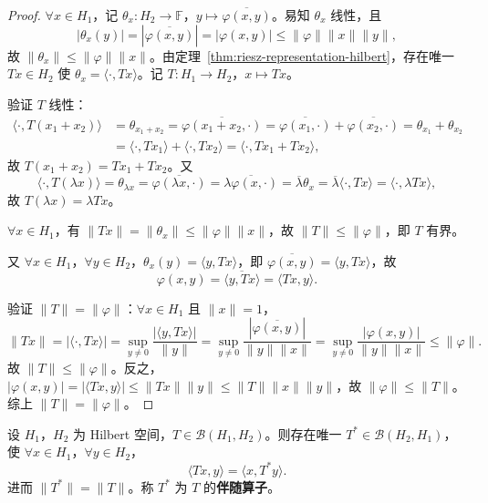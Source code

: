 \documentclass[lang=cn,a4paper,newtx,section]{elegantbook}
\begin{document}
\begin{proof}
  $\forall x\in H_1$，记 $\theta_x:H_2\to\mathbb{F}$，$y\mapsto\overline{\varphi(x,y)}$。易知 $\theta_x$ 线性，且
  \[
    |\theta_x(y)|=|\overline{\varphi(x,y)}|=|\varphi(x,y)|\leq\|\varphi\|\|x\|\|y\|,
  \]
  故 $\|\theta_x\|\leq\|\varphi\|\|x\|$。由定理~\ref{thm:riesz-representation-hilbert}，存在唯一 $Tx\in H_2$ 使 $\theta_x=\langle\cdot,Tx\rangle$。记 $T:H_1\to H_2$，$x\mapsto Tx$。

  验证 $T$ 线性：
  \begin{align*}
    \langle\cdot,T(x_1+x_2)\rangle&=\theta_{x_1+x_2}=\overline{\varphi(x_1+x_2,\cdot)}=\overline{\varphi(x_1,\cdot)}+\overline{\varphi(x_2,\cdot)}=\theta_{x_1}+\theta_{x_2}\\
    &=\langle\cdot,Tx_1\rangle+\langle\cdot,Tx_2\rangle=\langle\cdot,Tx_1+Tx_2\rangle,
  \end{align*}
  故 $T(x_1+x_2)=Tx_1+Tx_2$。又
  \[
    \langle\cdot,T(\lambda x)\rangle=\theta_{\lambda x}=\overline{\varphi(\lambda x,\cdot)}=\overline{\lambda\varphi(x,\cdot)}=\overline{\lambda}\theta_x=\overline{\lambda}\langle\cdot,Tx\rangle=\langle\cdot,\lambda Tx\rangle,
  \]
  故 $T(\lambda x)=\lambda Tx$。

  $\forall x\in H_1$，有 $\|Tx\|=\|\theta_x\|\leq\|\varphi\|\|x\|$，故 $\|T\|\leq\|\varphi\|$，即 $T$ 有界。

  又 $\forall x\in H_1$，$\forall y\in H_2$，$\theta_x(y)=\langle y,Tx\rangle$，即 $\overline{\varphi(x,y)}=\langle y,Tx\rangle$，故
  \[
    \varphi(x,y)=\overline{\langle y,Tx\rangle}=\langle Tx,y\rangle.
  \]

  验证 $\|T\|=\|\varphi\|$：$\forall x\in H_1$ 且 $\|x\|=1$，
  \[
    \|Tx\|=|\langle\cdot,Tx\rangle|=\sup_{y\neq 0}\frac{|\langle y,Tx\rangle|}{\|y\|}=\sup_{y\neq 0}\frac{|\overline{\varphi(x,y)}|}{\|y\|\|x\|}=\sup_{y\neq 0}\frac{|\varphi(x,y)|}{\|y\|\|x\|}\leq\|\varphi\|.
  \]
  故 $\|T\|\leq\|\varphi\|$。反之，$|\varphi(x,y)|=|\langle Tx,y\rangle|\leq\|Tx\|\|y\|\leq\|T\|\|x\|\|y\|$，故 $\|\varphi\|\leq\|T\|$。综上 $\|T\|=\|\varphi\|$。
\end{proof}

\begin{corollary}[伴随算子]
  设 $H_1$，$H_2$ 为 Hilbert 空间，$T\in\mathcal{B}(H_1,H_2)$。则存在唯一 $T^*\in\mathcal{B}(H_2,H_1)$，使 $\forall x\in H_1$，$\forall y\in H_2$，
  \[
    \langle Tx,y\rangle=\langle x,T^*y\rangle.
  \]
  进而 $\|T^*\|=\|T\|$。称 $T^*$ 为 $T$ 的\textbf{伴随算子}。
\end{corollary}
\end{document}
